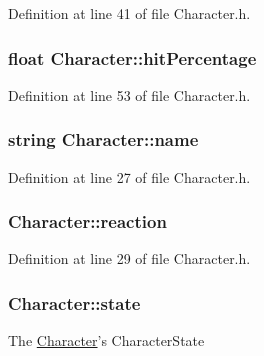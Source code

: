 Definition at line 41 of file Character.\-h.

\hypertarget{class_character_a6328c239882a3c7794332d24d100e02d}{
\subsubsection[{hit\-Percentage}]{\setlength{\rightskip}{0pt plus 5cm}float Character\-::hit\-Percentage\hspace{0.3cm}{\ttfamily [protected]}}}\label{class_character_a6328c239882a3c7794332d24d100e02d}


Definition at line 53 of file Character.\-h.

\hypertarget{class_character_a2d423654566d1bf2160fef74bf04cc84}{
\subsubsection[{name}]{\setlength{\rightskip}{0pt plus 5cm}string Character\-::name\hspace{0.3cm}{\ttfamily [protected]}}}\label{class_character_a2d423654566d1bf2160fef74bf04cc84}


Definition at line 27 of file Character.\-h.

\hypertarget{class_character_a579933775b2e4e97465bacb09c4e87f5}{
\subsubsection[{reaction}]{ Character\-::reaction\hspace{0.3cm}{\ttfamily [protected]}}}\label{class_character_a579933775b2e4e97465bacb09c4e87f5}


Definition at line 29 of file Character.\-h.

\hypertarget{class_character_ac20f1ebda238017ddc245ecdce827037}{
\subsubsection[{state}]{ Character\-::state\hspace{0.3cm}{\ttfamily [protected]}}}\label{class_character_ac20f1ebda238017ddc245ecdce827037}
The \hyperlink{class_character}{Character}'s Character\-State 

